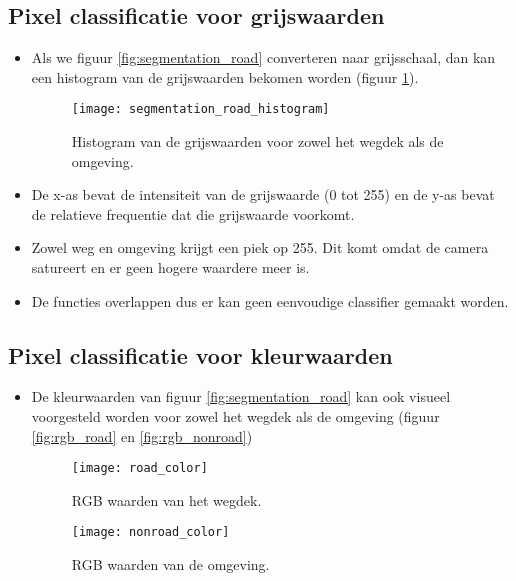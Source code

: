 \subsection{Pixel classificatie voor grijswaarden}
\begin{itemize}
	\item Als we figuur \ref{fig:segmentation_road} converteren  naar grijsschaal, dan kan een histogram van de grijswaarden bekomen worden (figuur \ref{fig:segmentation_road_histogram}).
	\begin{figure}[ht]
		\centering
		\texttt{[image: segmentation\_road\_histogram]}
		\caption{Histogram van de grijswaarden voor zowel het wegdek als de omgeving.}
		\label{fig:segmentation_road_histogram}
	\end{figure}
	\item De x-as bevat de intensiteit van de grijswaarde (0 tot 255) en de y-as bevat de relatieve frequentie dat die grijswaarde voorkomt. 
	
	\item Zowel weg en omgeving krijgt een piek op 255. Dit komt omdat de camera satureert en er geen hogere waardere meer is.
	\item De functies overlappen dus er kan geen eenvoudige classifier gemaakt worden.
\end{itemize}
\subsection{Pixel classificatie voor kleurwaarden}
\begin{itemize}
	\item De kleurwaarden van figuur \ref{fig:segmentation_road} kan ook visueel voorgesteld worden voor zowel het wegdek als de omgeving (figuur \ref{fig:rgb_road} en \ref{fig:rgb_nonroad})
	\begin{figure}[!htb]
		\begin{minipage}{0.48\textwidth}
			\centering
			\texttt{[image: road\_color]}
			\caption{RGB waarden van het wegdek.}
			\label{fig:rgb_road}
		\end{minipage}\hfill
		\begin{minipage}{0.48\textwidth}
			\centering
			\texttt{[image: nonroad\_color]}
			\caption{RGB waarden van de omgeving.}
			\label{fig:rgb_nonroad}
		\end{minipage}
	\label{epic}
	\end{figure}


\end{itemize}